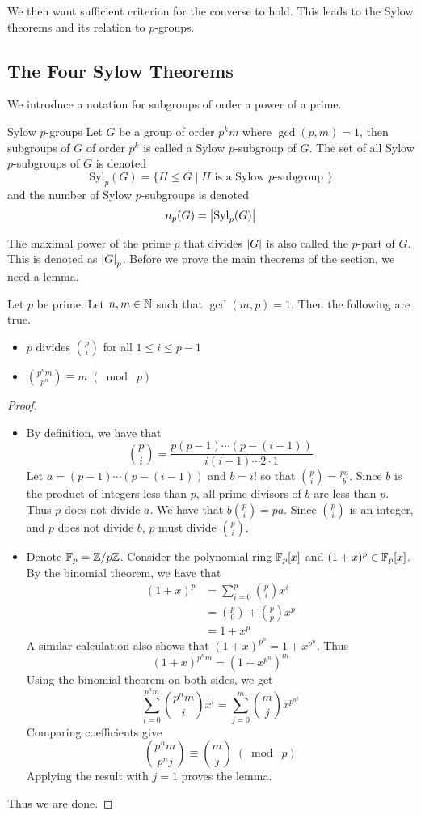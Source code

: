 \documentclass[a4paper]{article}
\begin{document}
We then want sufficient criterion for the converse to hold. This leads to the Sylow theorems and its relation to $p$-groups. 
\subsection{The Four Sylow Theorems}
We introduce a notation for subgroups of order a power of a prime. 

\begin{defn}{Sylow $p$-groups}{} Let $G$ be a group of order $p^km$ where $\gcd(p,m)=1$, then subgroups of $G$ of order $p^k$ is called a Sylow $p$-subgroup of $G$. The set of all Sylow $p$-subgroups of $G$ is denoted $$\text{Syl}_p(G)=\{H\leq G\;|\;H\text{ is a Sylow }p\text{-subgroup }\}$$ and the number of Sylow $p$-subgroups is denoted $$n_p(G)=\abs{\text{Syl}_p(G)}$$ 
\end{defn}

The maximal power of the prime $p$ that divides $\abs{G}$ is also called the $p$-part of $G$. This is denoted as $\abs{G}_p$. Before we prove the main theorems of the section, we need a lemma. 

\begin{lmm}{}{} Let $p$ be prime. Let $n,m\in\mathbb{N}$ such that $\gcd(m,p)=1$. Then the following are true. 
\begin{itemize}
\item $p$ divides $\binom{p}{i}$ for all $1\leq i\leq p-1$
\item $\binom{p^nm}{p^n}\equiv m\;(\bmod\;p)$
\end{itemize} 
\begin{proof}~\\
\begin{itemize}
\item By definition, we have that $$\binom{p}{i}=\frac{p(p-1)\cdots(p-(i-1))}{i(i-1)\cdots2\cdot 1}$$ Let $a=(p-1)\cdots(p-(i-1))$ and $b=i!$ so that $\binom{p}{i}=\frac{pa}{b}$. Since $b$ is the product of integers less than $p$, all prime divisors of $b$ are less than $p$. Thus $p$ does not divide $a$. We have that $b\binom{p}{i}=pa$. Since $\binom{p}{i}$ is an integer, and $p$ does not divide $b$, $p$ must divide $\binom{p}{i}$. 
\item Denote $\mathbb{F}_p=\mathbb{Z}/p\mathbb{Z}$. Consider the polynomial ring $\mathbb{F}_p[x]$ and $(1+x)^p\in\mathbb{F}_p[x]$. By the binomial theorem, we have that 
\begin{align*}
(1+x)^p&=\sum_{i=0}^p\binom{p}{i}x^i\\
&=\binom{p}{0}+\binom{p}{p}x^p\\
&=1+x^p
\end{align*}
A similar calculation also shows that $(1+x)^{p^n}=1+x^{p^n}$. Thus $$(1+x)^{p^nm}=(1+x^{p^n})^m$$ Using the binomial theorem on both sides, we get $$\sum_{i=0}^{p^nm}\binom{p^nm}{i}x^i=\sum_{j=0}^m\binom{m}{j}x^{p^{n^j}}$$ Comparing coefficients give $$\binom{p^nm}{p^nj}\equiv\binom{m}{j}\;(\bmod\;p)$$ Applying the result with $j=1$ proves the lemma. 
\end{itemize}
Thus we are done. 
\end{proof}
\end{lmm}
\end{document}

